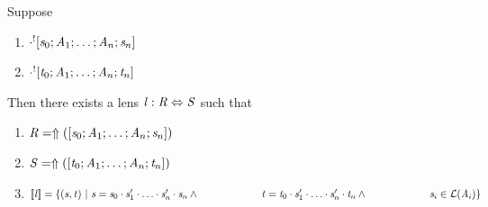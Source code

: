 \documentclass[numbers]{sigplanconf}
\begin{document}
\begin{lemma}
  \label{lem:boilerplate-alterations}
  Suppose
  \begin{enumerate}
  \item $\cdot^![\mathit{s}_0;\mathit{A}_1;\ldots;\mathit{A}_n;\mathit{s}_n]$
  \item $\cdot^![\mathit{t}_0;\mathit{A}_1;\ldots;\mathit{A}_n;\mathit{t}_n]$
  \end{enumerate}
  Then there exists a lens
  $\mathit{l} : \mathit{R} \Leftrightarrow \mathit{S}$ such that
  \begin{enumerate}
  \item $\mathit{R} = \Uparrow([\mathit{s}_0;\mathit{A}_1;\ldots;\mathit{A}_n;\mathit{s}_n])$
  \item $\mathit{S} = \Uparrow([\mathit{t}_0;\mathit{A}_1;\ldots;\mathit{A}_n;\mathit{t}_n])$
  \item $[ \! [\mathit{l}] \! ]=\{(\mathit{s},\mathit{t})~|~
      \mathit{s}=\mathit{s}_0\cdot\mathit{s}_1'\cdot\ldots\cdot\mathit{s}_n'\cdot\mathit{s}_n
      \wedge\\
      \hspace*{6.1em}\mathit{t}=\mathit{t}_0\cdot\mathit{s}_1'\cdot\ldots\cdot\mathit{s}_n'\cdot\mathit{t}_n
      \wedge\\
      \hspace*{6.1em}\mathit{s}_i\in\mathcal{L}(\mathit{A}_i)\}$
  \end{enumerate}
\end{lemma}
\end{document}
